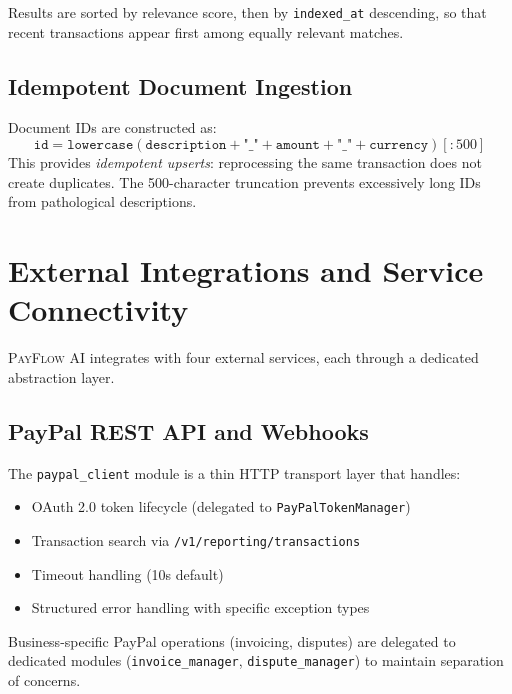 \documentclass[11pt,a4paper]{article}
\newcommand{\payflow}{\textsc{PayFlow AI}}
\begin{document}
Results are sorted by relevance score, then by \texttt{indexed\_at} descending, so that recent transactions appear first among equally relevant matches.

\subsection{Idempotent Document Ingestion}
\label{subsec:idempotent}

Document IDs are constructed as:
\begin{equation}
  \texttt{id} = \texttt{lowercase}(\texttt{description} + \texttt{"\_"} + \texttt{amount} + \texttt{"\_"} + \texttt{currency})[:500]
\end{equation}
This provides \emph{idempotent upserts}: reprocessing the same transaction does not create duplicates. The 500-character truncation prevents excessively long IDs from pathological descriptions.


\section{External Integrations and Service Connectivity}
\label{sec:integrations}

\payflow{} integrates with four external services, each through a dedicated abstraction layer.

\subsection{PayPal REST API and Webhooks}
\label{subsec:paypal}

The \texttt{paypal\_client} module is a thin HTTP transport layer that handles:
\begin{itemize}[leftmargin=*]
  \item OAuth 2.0 token lifecycle (delegated to \texttt{PayPalTokenManager})
  \item Transaction search via \texttt{/v1/reporting/transactions}
  \item Timeout handling (10s default)
  \item Structured error handling with specific exception types
\end{itemize}

Business-specific PayPal operations (invoicing, disputes) are delegated to dedicated modules (\texttt{invoice\_manager}, \texttt{dispute\_manager}) to maintain separation of concerns.
\end{document}
